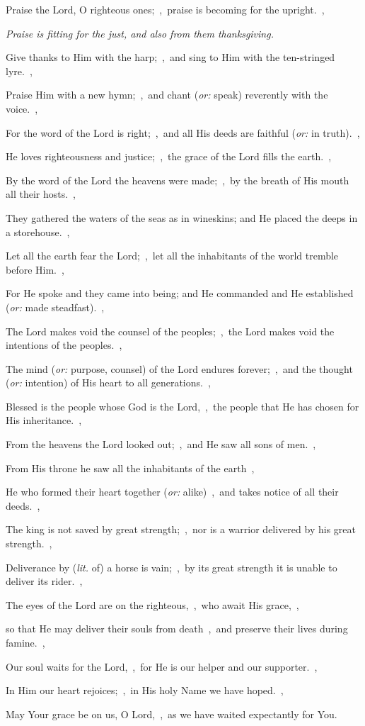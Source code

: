 \documentclass[12pt,twoside,a5paper]{article}
\newcommand{\qanona}[1]{{\liturgicalhint{Qanona.} \emph{#1}}}
\newcommand{\translationoption}[1]{\emph{or:} #1}
\newcommand{\translationliteral}[1]{\emph{lit.} #1}
\begin{document}
\begin{normalparskip}
  Praise the Lord, O righteous ones;~\sep\ praise is becoming for the upright.~\sep

  \qanona{Praise is fitting for the just, and also from them thanksgiving.}

  Give thanks to Him with the harp;~\sep\ and sing to Him with the ten-stringed lyre.~\sep

  Praise Him with a new hymn;~\sep\ and chant (\translationoption{speak}) reverently with the voice.~\sep

  For the word of the Lord is right;~\sep\ and all His deeds are faithful (\translationoption{in truth}).~\sep

  He loves righteousness and justice;~\sep\ the grace of the Lord fills the earth.~\sep

  By the word of the Lord the heavens were made;~\sep\ by the breath of His mouth all their hosts.~\sep

  They gathered the waters of the seas as in wineskins; and He placed the deeps in a storehouse.~\sep

  Let all the earth fear the Lord;~\sep\ let all the inhabitants of the world tremble before Him.~\sep

  For He spoke and they came into being; and He commanded and He established (\translationoption{made steadfast}).~\sep

  The Lord makes void the counsel of the peoples;~\sep\ the Lord makes void the intentions of the peoples.~\sep

  The mind (\translationoption{purpose, counsel}) of the Lord endures forever;~\sep\ and the thought (\translationoption{intention}) of His heart to all generations.~\sep

  Blessed is the people whose God is the Lord,~\sep\ the people that He has chosen for His inheritance.~\sep

  From the heavens the Lord looked out;~\sep\ and He saw all sons of men.~\sep

  From His throne he saw all the inhabitants of the earth~\sep

  He who formed their heart together (\translationoption{alike})~\sep\ and takes notice of all their deeds.~\sep

  The king is not saved by great strength;~\sep\ nor is a warrior delivered by his great strength.~\sep

  Deliverance by (\translationliteral{of}) a horse is vain;~\sep\ by its great strength it is unable to deliver its rider.~\sep

  The eyes of the Lord are on the righteous,~\sep\ who await His grace,~\sep

  so that He may deliver their souls from death~\sep\ and preserve their lives during famine.~\sep

  Our soul waits for the Lord,~\sep\ for He is our helper and our supporter.~\sep

  In Him our heart rejoices;~\sep\ in His holy Name we have hoped.~\sep

  May Your grace be on us, O Lord,~\sep\ as we have waited expectantly for You.
\end{normalparskip}
\end{document}

